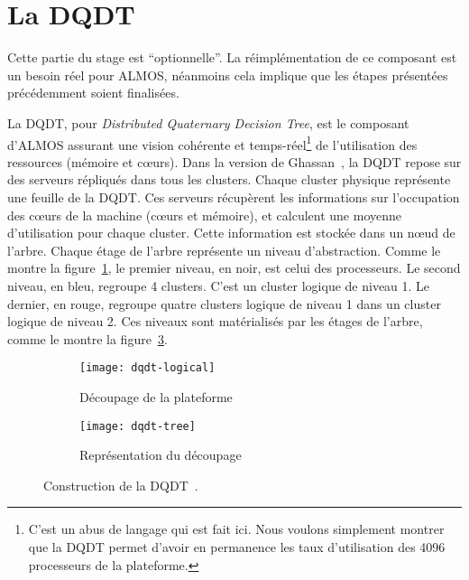  \section{La DQDT}
  \label{sec:dqdt}

    Cette partie du stage est ``optionnelle''. La réimplémentation de ce
    composant est un besoin réel pour ALMOS, néanmoins cela implique que les
    étapes présentées précédemment soient finalisées.

    La DQDT, pour \textit{Distributed Quaternary Decision Tree}, est le
    composant d'ALMOS assurant une vision cohérente et temps-réel\footnote{C'est
      un abus de langage qui est fait ici. Nous voulons simplement montrer que
      la DQDT permet d'avoir en permanence les taux d'utilisation des 4096
      processeurs de la plateforme.} de l'utilisation des ressources (mémoire et
    c\oe urs). Dans la version de Ghassan~\citet{almaless2014universite}, la
    DQDT repose sur des serveurs répliqués dans tous les clusters. Chaque
    cluster physique représente une feuille de la DQDT. Ces serveurs récupèrent
    les informations sur l'occupation des c\oe urs de la machine (c\oe urs et
    mémoire), et calculent une moyenne d'utilisation pour chaque cluster. Cette
    information est stockée dans un n\oe ud de l'arbre. Chaque étage de l'arbre
    représente un niveau d'abstraction. Comme le montre la
    figure~\ref{fig:dqdt-logical}, le premier niveau, en noir, est celui des
    processeurs. Le second niveau, en bleu, regroupe 4 clusters. C'est un
    cluster logique de niveau 1. Le dernier, en rouge, regroupe quatre clusters
    logique de niveau 1 dans un cluster logique de niveau 2. Ces niveaux sont
    matérialisés par les étages de l'arbre, comme le montre la
    figure~\ref{fig:dqdt-tree}.\\

    \begin{figure}[ht]
      \begin{subfigure}[b]{0.5\textwidth}
        \texttt{[image: dqdt-logical]}
        \caption{Découpage de la plateforme}
        \label{fig:dqdt-logical}
      \end{subfigure}
      \begin{subfigure}[b]{0.4\textwidth}
        \texttt{[image: dqdt-tree]}
        \caption{Représentation du découpage}
        \label{fig:dqdt-tree}
      \end{subfigure}
      \caption{Construction de la DQDT~\citep{almaless2014universite}.}
    \end{figure}

